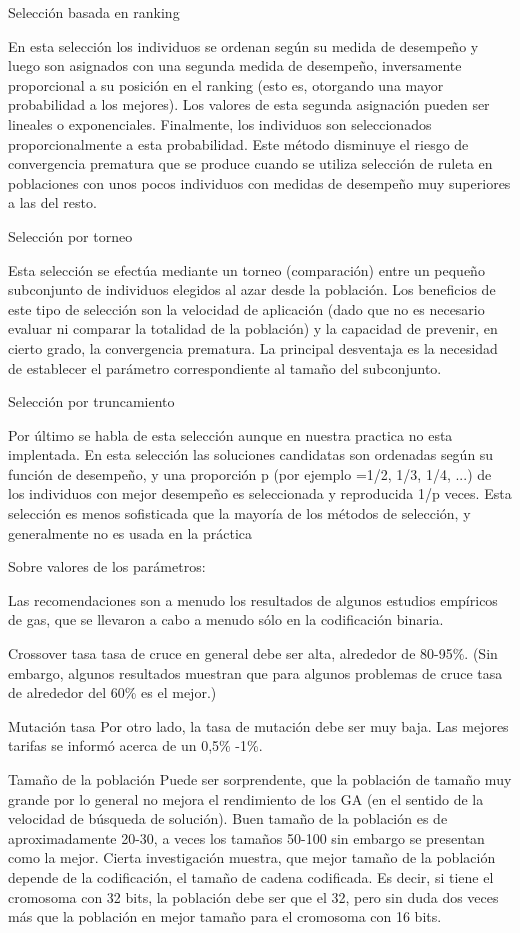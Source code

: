 \documentclass[12pt]{article}
\begin{document}
Selección basada en ranking

En esta selección los individuos se ordenan según su medida de desempeño y luego son asignados con una segunda medida de desempeño, inversamente proporcional a su posición en el ranking (esto es, otorgando una mayor probabilidad a los mejores). Los valores de esta segunda asignación pueden ser lineales o exponenciales. Finalmente, los individuos son seleccionados proporcionalmente a esta probabilidad.
Este método disminuye el riesgo de convergencia prematura que se produce cuando se utiliza selección de ruleta en poblaciones con unos pocos individuos con medidas de desempeño muy superiores a las del resto.


Selección por torneo

Esta selección se efectúa mediante un torneo (comparación) entre un pequeño subconjunto de individuos elegidos al azar desde la población.
Los beneficios de este tipo de selección son la velocidad de aplicación (dado que no es necesario evaluar ni comparar la totalidad de la población) y la capacidad de prevenir, en cierto grado, la convergencia prematura. La principal desventaja es la necesidad de establecer el parámetro correspondiente al tamaño del subconjunto.	 

Selección por truncamiento

Por último se habla de esta selección aunque en nuestra practica no esta implentada. En esta selección las soluciones candidatas son ordenadas según su función de desempeño, y una proporción p (por ejemplo =1/2, 1/3, 1/4, ...) de los individuos con mejor desempeño es seleccionada y reproducida 1/p veces. Esta selección es menos sofisticada que la mayoría de los métodos de selección, y generalmente no es usada en la práctica


Sobre valores de los parámetros:


Las recomendaciones son a menudo los resultados de algunos estudios empíricos de gas, que se llevaron a cabo a menudo sólo en la codificación binaria.

Crossover tasa
tasa de cruce en general debe ser alta, alrededor de 80-95\%. (Sin embargo, algunos resultados muestran que para algunos problemas de cruce tasa de alrededor del 60\% es el mejor.)

Mutación tasa
Por otro lado, la tasa de mutación debe ser muy baja. Las mejores tarifas se informó acerca de un 0,5\% -1\%.

Tamaño de la población
Puede ser sorprendente, que la población de tamaño muy grande por lo general no mejora el rendimiento de los GA (en el sentido de la velocidad de búsqueda de solución). Buen tamaño de la población es de aproximadamente 20-30, a veces los tamaños 50-100 sin embargo se presentan como la mejor. Cierta investigación muestra, que mejor tamaño de la población depende de la codificación, el tamaño de cadena codificada. Es decir, si tiene el cromosoma con 32 bits, la población debe ser que el 32, pero sin duda dos veces más que la población en mejor tamaño para el cromosoma con 16 bits.
\end{document}
